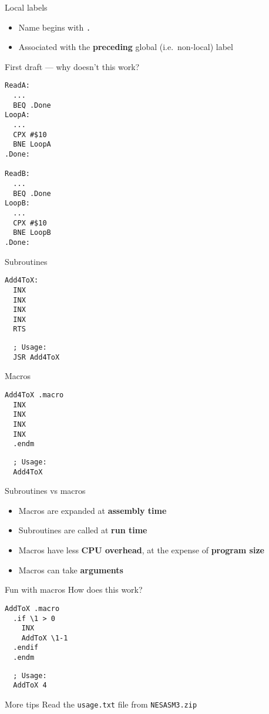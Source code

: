 \begin{frame}{Local labels}
	\begin{itemize}
		\pause\item Name begins with \lstinline{.}
		\pause\item Associated with the \textbf{preceding} global (i.e.\ non-local) label
	\end{itemize}
\end{frame}

\begin{frame}[fragile]{First draft --- why doesn't this work?}
\begin{lstlisting}
ReadA: 
  ...
  BEQ .Done   
LoopA:
  ...         
  CPX #$10			
  BNE LoopA
.Done:

ReadB: 
  ...
  BEQ .Done   
LoopB:
  ...         
  CPX #$10			
  BNE LoopB
.Done:
\end{lstlisting}
\end{frame}

\begin{frame}[fragile]{Subroutines}
\begin{lstlisting}
Add4ToX:
  INX
  INX
  INX
  INX
  RTS
\end{lstlisting}
\begin{lstlisting}
  ; Usage:
  JSR Add4ToX
\end{lstlisting}
\end{frame}

\begin{frame}[fragile]{Macros}
\begin{lstlisting}
Add4ToX .macro
  INX
  INX
  INX
  INX
  .endm
\end{lstlisting}
\begin{lstlisting}
  ; Usage:
  Add4ToX
\end{lstlisting}
\end{frame}

\begin{frame}{Subroutines vs macros}
	\begin{itemize}
		\pause\item Macros are expanded at \textbf{assembly time}
		\pause\item Subroutines are called at \textbf{run time}
		\pause\item Macros have less \textbf{CPU overhead}, at the expense of \textbf{program size}
		\pause\item Macros can take \textbf{arguments}
	\end{itemize}
\end{frame}

\begin{frame}[fragile]{Fun with macros}
	How does this work?
\begin{lstlisting}
AddToX .macro
  .if \1 > 0
    INX
    AddToX \1-1
  .endif
  .endm
\end{lstlisting}
\begin{lstlisting}
  ; Usage:
  AddToX 4
\end{lstlisting}
\end{frame}

\begin{frame}{More tips}
	Read the \texttt{usage.txt} file from \texttt{NESASM3.zip}
\end{frame}

